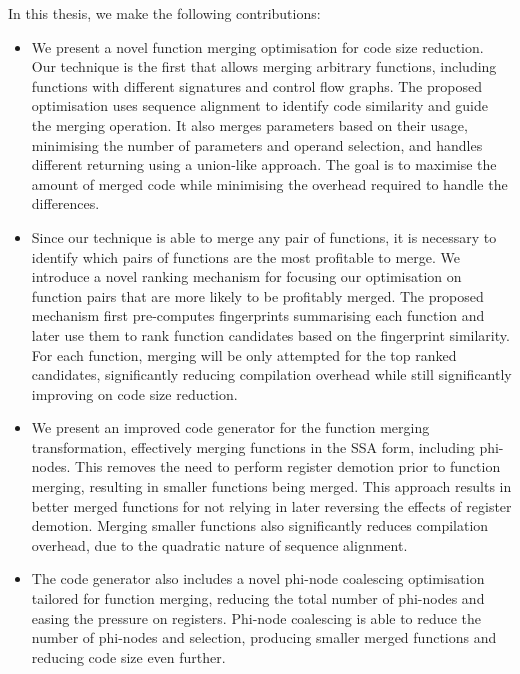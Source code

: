 In this thesis, we make the following contributions:
\begin{itemize}
  \item 
  We present a novel function merging optimisation for code size reduction.
  Our technique is the first that allows merging arbitrary functions, including functions with different signatures and control flow graphs.
  The proposed optimisation uses sequence alignment to identify code similarity and guide the merging operation.
  It also merges parameters based on their usage, minimising the number of parameters and operand selection, and handles different returning using a union-like approach.
  The goal is to maximise the amount of merged code while minimising the overhead required to handle the differences.
  
  \item
  Since our technique is able to merge any pair of functions, it is necessary to identify which pairs of functions are the most profitable to merge.
  We introduce a novel ranking mechanism for focusing our optimisation on function pairs that are more likely to be profitably merged.
  The proposed mechanism first pre-computes fingerprints summarising each function and later use them to rank function candidates based on the fingerprint similarity.
  For each function, merging will be only attempted for the top ranked candidates, significantly reducing compilation overhead while still significantly improving on code size reduction.


  \item
  We present an improved code generator for the function merging transformation, effectively merging functions in the SSA form, including phi-nodes.
  This removes the need to perform register demotion prior to function merging, resulting in smaller functions being merged. 
  This approach results in better merged functions for not relying in later reversing the effects of register demotion.
  Merging smaller functions also significantly reduces compilation overhead, due to the quadratic nature of sequence alignment.

  \item
  The code generator also includes a novel phi-node coalescing optimisation tailored for function merging, reducing the total number of phi-nodes and easing the pressure on registers.
  Phi-node coalescing is able to reduce the number of phi-nodes and selection, producing smaller merged functions and reducing code size even further.


\end{itemize}

